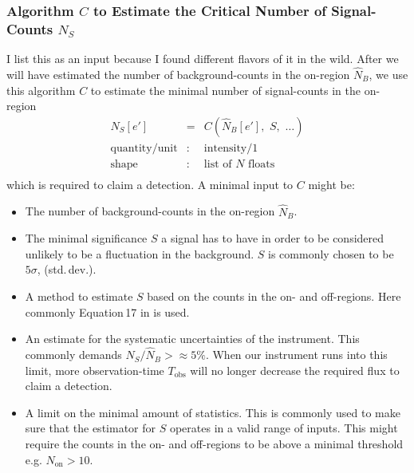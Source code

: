 \documentclass{article}%
\begin{document}
            \subsubsection*{Algorithm $C$ to Estimate the Critical Number of Signal-Counts $N_S$}
                I list this as an input because I found different flavors of it in the wild.
                After we will have estimated the number of background-counts in the on-region $\hat{N}_B$, we use this algorithm $C$ to estimate the minimal number of signal-counts in the on-region
                \begin{eqnarray*}
                    N_S[e'] &=& C(\hat{N}_B[e'],\,\,S,\,\,\dots)\\
                    \text{quantity}/\text{unit} &:& \text{intensity}/1\\
                    \text{shape} &:& \text{list of}\,\,N\,\,\text{floats}\\
                \end{eqnarray*}
                which is required to claim a detection.
                A minimal input to $C$ might be:
                \begin{itemize}
                    \item{}
                        The number of background-counts in the on-region $\hat{N}_B$.
                    \item{}
                        The minimal significance $S$ a signal has to have in order to be considered unlikely to be a fluctuation in the background.
                        $S$ is commonly chosen to be $5\sigma$, (std.\,dev.).
                    \item{}
                        A method to estimate $S$ based on the counts in the on- and off-regions. Here commonly Equation\,17 in \cite{li1983analysis} is used.
                    \item{}
                        An estimate for the systematic uncertainties of the instrument. This commonly demands $N_S/\hat{N}_B >\approx 5\%$.
                        When our instrument runs into this limit, more observation-time $T_\text{obs}$ will no longer decrease the required flux to claim a detection.
                    \item{}
                        A limit on the minimal amount of statistics. This is commonly used to make sure that the estimator for $S$ operates in a valid range of inputs.
                        This might require the counts in the on- and off-regions to be above a minimal threshold e.g. $N_\text{on} > 10$.
                \end{itemize}
\end{document}
